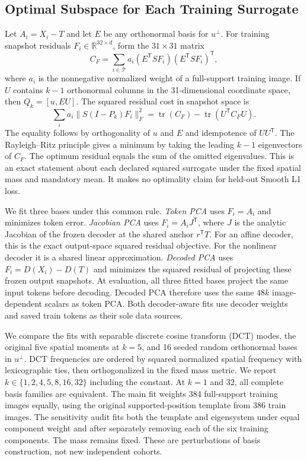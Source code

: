 \subsection{Optimal Subspace for Each Training Surrogate}
Let $A_i=X_i-T$ and let $E$ be any orthonormal basis for $u^\perp$. For training snapshot residuals $F_i\in\mathbb{R}^{32\times d}$, form the $31\times31$ matrix
\begin{equation}
 C_F=\sum_{i\in\mathcal T} a_i
 (E^\mathsf{T}SF_i)(E^\mathsf{T}SF_i)^\mathsf{T},
\end{equation}
where $a_i$ is the nonnegative normalized weight of a full-support training image. If $U$ contains $k-1$ orthonormal columns in the 31-dimensional coordinate space, then $Q_k=[u,EU]$. The squared residual cost in snapshot space is
\begin{equation}
 \sum_i a_i\|S(I-P_k)F_i\|_F^2
 =\operatorname{tr}(C_F)-\operatorname{tr}(U^\mathsf{T}C_F U).
 \label{eq:spatial-optimum}
\end{equation}
The equality follows by orthogonality of $u$ and $E$ and idempotence of $UU^\mathsf{T}$. The Rayleigh--Ritz principle gives a minimum by taking the leading $k-1$ eigenvectors of $C_F$. The optimum residual equals the sum of the omitted eigenvalues. This is an exact statement about each declared squared surrogate under the fixed spatial mass and mandatory mean. It makes no optimality claim for held-out Smooth L1 loss.

We fit three bases under this common rule. \emph{Token PCA} uses $F_i=A_i$ and minimizes token error. \emph{Jacobian PCA} uses $F_i=A_i J^\mathsf{T}$, where $J$ is the analytic Jacobian of the frozen decoder at the shared anchor $r^\mathsf{T}T$. For an affine decoder, this is the exact output-space squared residual objective. For the nonlinear decoder it is a shared linear approximation. \emph{Decoded PCA} uses $F_i=D(X_i)-D(T)$ and minimizes the squared residual of projecting these frozen output snapshots. At evaluation, all three fitted bases project the same input tokens before decoding. Decoded PCA therefore uses the same $48k$ image-dependent scalars as token PCA. Both decoder-aware fits use decoder weights and saved train tokens as their sole data sources.

We compare the fits with separable discrete cosine transform (DCT) modes, the original five spatial moments at $k=5$, and 16 seeded random orthonormal bases in $u^\perp$. DCT frequencies are ordered by squared normalized spatial frequency with lexicographic ties, then orthogonalized in the fixed mass metric. We report $k\in\{1,2,4,5,8,16,32\}$ including the constant. At $k=1$ and $32$, all complete basis families are equivalent. The main fit weights 384 full-support training images equally, using the original supported-position template from 386 train images. The sensitivity audit fits both the template and eigensystem under equal component weight and after separately removing each of the six training components. The mass remains fixed. These are perturbations of basis construction, not new independent cohorts.

